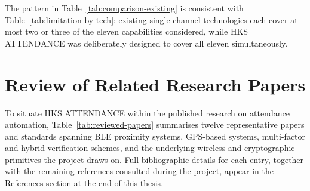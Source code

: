 \documentclass[12pt, a4paper, oneside]{report}
\begin{document}
\begin{table}[htbp]
\centering
\caption{Comparison Between Existing Systems and HKS ATTENDANCE}
\label{tab:comparison-existing}
\scriptsize
\setlength{\tabcolsep}{2.5pt}
\renewcommand{\arraystretch}{1.1}
\end{table}

The pattern in Table~\ref{tab:comparison-existing} is consistent with Table~\ref{tab:limitation-by-tech}: existing single-channel technologies each cover at most two or three of the eleven capabilities considered, while HKS ATTENDANCE was deliberately designed to cover all eleven simultaneously.

\section{Review of Related Research Papers}

To situate HKS ATTENDANCE within the published research on attendance automation, Table~\ref{tab:reviewed-papers} summarises twelve representative papers and standards spanning BLE proximity systems, GPS-based systems, multi-factor and hybrid verification schemes, and the underlying wireless and cryptographic primitives the project draws on. Full bibliographic details for each entry, together with the remaining references consulted during the project, appear in the References section at the end of this thesis.
\end{document}
